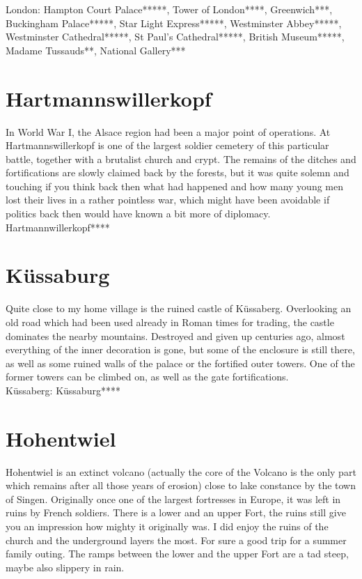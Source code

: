 London: Hampton Court Palace*****, Tower of London****, Greenwich***, Buckingham Palace*****, Star Light Express*****, Westminster Abbey*****, Westminster Cathedral*****, St Paul's Cathedral*****, British Museum*****, Madame Tussauds**, National Gallery***

\section{Hartmannswillerkopf}
\label{1996:Hartmannswillerkopf}

In World War I, the Alsace region had been a major point of operations. At Hartmannswillerkopf is one of the largest soldier cemetery of this particular battle, together with a brutalist church and crypt. The remains of the ditches and fortifications are slowly claimed back by the forests, but it was quite solemn and touching if you think back then what had happened and how many young men lost their lives in a rather pointless war, which might have been avoidable if politics back then would have known a bit more of diplomacy.\\

Hartmannwillerkopf****

\section{K\"ussaburg}
\label{1996:Kuessaburg}

Quite close to my home village is the ruined castle of K\"ussaberg. Overlooking an old road which had been used already in Roman times for trading, the castle dominates the nearby mountains. Destroyed and given up centuries ago, almost everything of the inner decoration is gone, but some of the enclosure is still there, as well as some ruined walls of the palace or the fortified outer towers. One of the former towers can be climbed on, as well as the gate fortifications.\\

K\"ussaberg: K\"ussaburg****

\section{Hohentwiel}
\label{1996:Hohentwiel}

Hohentwiel is an extinct volcano (actually the core of the Volcano is the only part which remains after all those years of erosion) close to lake constance by the town of Singen. Originally once one of the largest fortresses in Europe, it was left in ruins by French soldiers. There is a lower and an upper Fort, the ruins still give you an impression how mighty it originally was. I did enjoy the ruins of the church and the underground layers the most. For sure a good trip for a summer family outing. The ramps between the lower and the upper Fort are a tad steep, maybe also slippery in rain.\\


